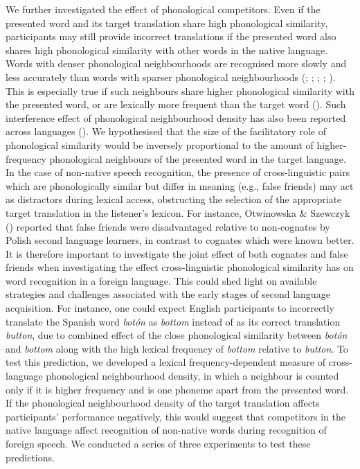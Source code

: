 \documentclass[
]{article}
\begin{document}
We further investigated the effect of phonological competitors. Even if
the presented word and its target translation share high phonological
similarity, participants may still provide incorrect translations if the
presented word also shares high phonological similarity with other words
in the native language. Words with denser phonological neighbourhoods
are recognised more slowly and less accurately than words with sparser
phonological neighbourhoods (; ; ; ;
). This is
especially true if such neighbours share higher phonological similarity
with the presented word, or are lexically more frequent than the target
word (). Such
interference effect of phonological neighbourhood density has also been
reported across languages (). We hypothesised that the size of the facilitatory role
of phonological similarity would be inversely proportional to the amount
of higher-frequency phonological neighbours of the presented word in the
target language. In the case of non-native speech recognition, the
presence of cross-linguistic pairs which are phonologically similar but
differ in meaning (e.g., false friends) may act as distractors during
lexical access, obstructing the selection of the appropriate target
translation in the listener's lexicon. For instance, Otwinowska \&
Szewczyk () reported that false
friends were disadvantaged relative to non-cognates by Polish second
language learners, in contrast to cognates which were known better. It
is therefore important to investigate the joint effect of both cognates
and false friends when investigating the effect cross-linguistic
phonological similarity has on word recognition in a foreign language.
This could shed light on available strategies and challenges associated
with the early stages of second language acquisition. For instance, one
could expect English participants to incorrectly translate the Spanish
word \emph{botón} as \emph{bottom} instead of as its correct translation
\emph{button}, due to combined effect of the close phonological
similarity between \emph{botón} and \emph{bottom} along with the high
lexical frequency of \emph{bottom} relative to \emph{button}. To test
this prediction, we developed a lexical frequency-dependent measure of
cross-language phonological neighbourhood density, in which a neighbour
is counted only if it is higher frequency and is one phoneme apart from
the presented word. If the phonological neighbourhood density of the
target translation affects participants' performance negatively, this
would suggest that competitors in the native language affect recognition
of non-native words during recognition of foreign speech. We conducted a
series of three experiments to test these predictions.
\end{document}
